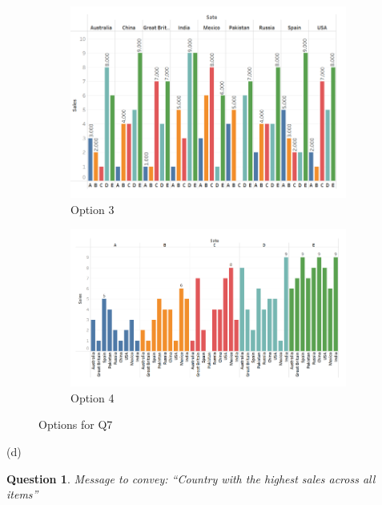 \documentclass[11pt,fleqn]{book} %
\newtheorem{question}{Question}
\begin{document}
\begin{example}
\begin{figure}[hitb!]
\begin{subfigure}[c]{0.35\linewidth}
    \includegraphics[width=\linewidth]{Pictures/op3.png}
    \caption{Option 3}
    \label{fig:pa1-op3}
  \end{subfigure}
  \hfill
  \begin{subfigure}[c]{0.35\linewidth}
    \includegraphics[width=\linewidth]{Pictures/op4.png}
    \caption{Option 4}
    \label{fig:pa1-op4}
  \end{subfigure}
  \caption{Options for Q7}
  \label{fig:pa1-op}
\end{figure}

\begin{rotanswer}
  (d)
\end{rotanswer}

\begin{question}
Message to convey: “Country with the highest sales across all items”
\end{question}


\end{example}
\end{document}
